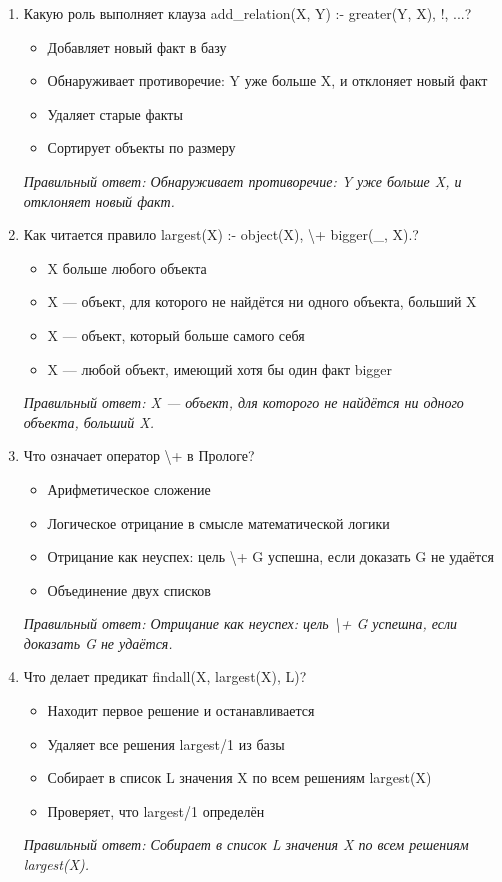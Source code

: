 \begin{enumerate}[label=\textbf{\arabic*.}, leftmargin=0pt, itemsep=1.2em]
\item Какую роль выполняет клауза add\_relation(X, Y) :- greater(Y, X), !, ...?
\begin{itemize}[label=$\square$, leftmargin=1.5cm, itemsep=0.2em, topsep=0.3em]
\item Добавляет новый факт в базу
\item Обнаруживает противоречие: Y уже больше X, и отклоняет новый факт
\item Удаляет старые факты
\item Сортирует объекты по размеру
\end{itemize}
{\small\textit{Правильный ответ: Обнаруживает противоречие: Y уже больше X, и отклоняет новый факт.}}

\item Как читается правило largest(X) :- object(X), \textbackslash{}+ bigger(\_, X).?
\begin{itemize}[label=$\square$, leftmargin=1.5cm, itemsep=0.2em, topsep=0.3em]
\item X больше любого объекта
\item X — объект, для которого не найдётся ни одного объекта, больший X
\item X — объект, который больше самого себя
\item X — любой объект, имеющий хотя бы один факт bigger
\end{itemize}
{\small\textit{Правильный ответ: X — объект, для которого не найдётся ни одного объекта, больший X.}}

\item Что означает оператор \textbackslash{}+ в Прологе?
\begin{itemize}[label=$\square$, leftmargin=1.5cm, itemsep=0.2em, topsep=0.3em]
\item Арифметическое сложение
\item Логическое отрицание в смысле математической логики
\item Отрицание как неуспех: цель \textbackslash{}+ G успешна, если доказать G не удаётся
\item Объединение двух списков
\end{itemize}
{\small\textit{Правильный ответ: Отрицание как неуспех: цель \textbackslash{}+ G успешна, если доказать G не удаётся.}}

\item Что делает предикат findall(X, largest(X), L)?
\begin{itemize}[label=$\square$, leftmargin=1.5cm, itemsep=0.2em, topsep=0.3em]
\item Находит первое решение и останавливается
\item Удаляет все решения largest/1 из базы
\item Собирает в список L значения X по всем решениям largest(X)
\item Проверяет, что largest/1 определён
\end{itemize}
{\small\textit{Правильный ответ: Собирает в список L значения X по всем решениям largest(X).}}


\end{enumerate}
